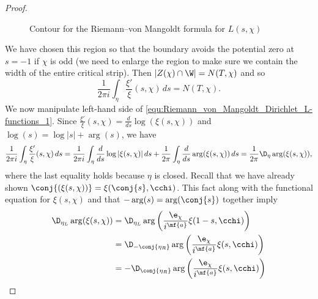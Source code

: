 \begin{proof}
\begin{figure}[ht]
          \caption{Contour for the Riemann–von Mangoldt formula for $L(s,\chi)$}
          \label{fig:Riemann_von_Mangoldt_Dirichlet_L-function_contour}
        \end{figure}
        
        We have chosen this region so that the boundary avoids the potential zero at $s = -1$ if $\chi$ is odd (we need to enlarge the region to make sure we contain the width of the entire critical strip). Then $|Z(\chi) \cap \W| = N(T,\chi)$ and so
        \begin{equation}\label{equ:Riemann_von_Mangoldt_Dirichlet_L-functions_1}
          \frac{1}{2\pi i}\int_{\eta}\frac{\xi'}{\xi}(s,\chi)\,ds = N(T,\chi).
        \end{equation}
        We now manipulate left-hand side of \cref{equ:Riemann_von_Mangoldt_Dirichlet_L-functions_1}. Since $\frac{\xi'}{\xi}(s,\chi) = \frac{d}{ds}\log(\xi(s,\chi))$ and $\log(s) = \log|s|+\arg(s)$, we have
        \begin{equation}\label{equ:Riemann_von_Mangoldt_Dirichlet_L-functions_2}
          \frac{1}{2\pi i}\int_{\eta}\frac{\xi'}{\xi}(s,\chi)\,ds = \frac{1}{2\pi i}\int_{\eta}\frac{d}{ds}\log|\xi(s,\chi)|\,ds+\frac{1}{2\pi }\int_{\eta}\frac{d}{ds}\arg(\xi(s,\chi))\,ds = \frac{1}{2\pi}\D_{\eta}\arg(\xi(s,\chi)),
        \end{equation}
        where the last equality holds because $\eta$ is closed. Recall that we have already shown $\conj{(\xi(s,\chi))} = \xi(\conj{s},\cchi)$. This fact along with the functional equation for $\xi(s,\chi)$ and that $-\arg(s) = \arg(\conj{s})$ together imply
        \begin{align*}
          \D_{\eta_{L}}\arg(\xi(s,\chi)) &= \D_{\eta_{L}}\arg\left(\frac{\e_{\chi}}{i^{\mf{a}}}\xi(1-s,\cchi)\right) \\
          &= \D_{-\conj{\eta_{R}}}\arg\left(\frac{\e_{\chi}}{i^{\mf{a}}}\xi(s,\cchi)\right) \\
          &= -\D_{\conj{\eta_{R}}}\arg\left(\frac{\e_{\chi}}{i^{\mf{a}}}\xi(s,\cchi)\right) \\

\end{align*}
\end{proof}
